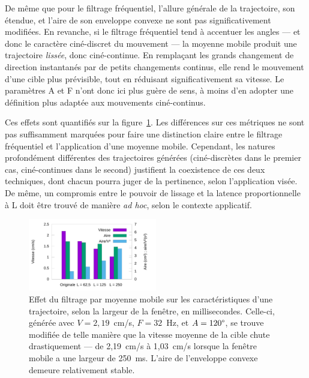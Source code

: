 	De même que pour le filtrage fréquentiel, l'allure générale de la trajectoire, son étendue, et l'aire de son enveloppe convexe ne sont pas significativement modifiées. En revanche, si le filtrage fréquentiel tend à accentuer les angles --- et donc le caractère ciné-discret du mouvement --- la moyenne mobile produit une trajectoire \emph{lissée}, donc ciné-continue. En remplaçant les grands changement de direction instantanés par de petits changements continus, elle rend le mouvement d'une cible plus prévisible, tout en réduisant significativement sa vitesse. Le paramètres A et F n'ont donc ici plus guère de sens, à moins d'en adopter une définition plus adaptée aux mouvements ciné-continus.
	
	Ces effets sont quantifiés sur la figure~\ref{fig:filteringByMovingAverageHistograms}. Les différences sur ces métriques ne sont pas suffisamment marquées pour faire une distinction claire entre le filtrage fréquentiel et l'application d'une moyenne mobile. Cependant, les natures profondément différentes des trajectoires générées (ciné-discrètes dans le premier cas, ciné-continues dans le second) justifient la coexistence de ces deux techniques, dont chacun pourra juger de la pertinence, selon l'application visée. De même, un compromis entre le \og pouvoir \fg{} de lissage et la latence proportionnelle à L doit être trouvé de manière \emph{ad hoc}, selon le contexte applicatif.
	
	\begin{figure}[htbp]
		\centering
		\includegraphics[width=0.5\textwidth]{figures/ch5/filteringByMovingAverageHistograms}
		\caption[Effet du filtrage par moyenne mobile]{Effet du filtrage par moyenne mobile sur les caractéristiques d'une trajectoire, selon la largeur de la fenêtre, en millisecondes. Celle-ci, générée avec $V=2,19$~cm/s, $F=32$~Hz, et $A=120\degree{}$, se trouve modifiée de telle manière que la vitesse moyenne de la cible chute drastiquement --- de 2,19~cm/s à 1,03~cm/s lorsque la fenêtre mobile a une largeur de 250~ms. L'aire de l'enveloppe convexe demeure relativement stable.}
		\label{fig:filteringByMovingAverageHistograms}
	\end{figure}
	
